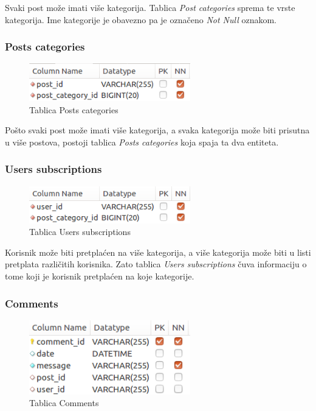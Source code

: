 \documentclass[zavrsni, numeric]{fer}
\begin{document}
Svaki post može imati više kategorija. Tablica \textit{Post categories} sprema te vrste kategorija. Ime kategorije je obavezno pa je označeno \textit{Not Null} oznakom.

\subsubsection{Posts categories}

\begin{figure}[H]
	\centering
	\includegraphics[width=7cm]{slike/t-posts_categories.png}
	\caption{Tablica Posts categories}
	\label{fig:t-posts_categories}
\end{figure}

Pošto svaki post može imati više kategorija, a svaka kategorija može biti prisutna u više postova, postoji tablica \textit{Posts categories} koja spaja ta dva entiteta.

\subsubsection{Users subscriptions}

\begin{figure}[H]
	\centering
	\includegraphics[width=7cm]{slike/t-users_subscriptions.png}
	\caption{Tablica Users subscriptions}
	\label{fig:t-users_subscriptions}
\end{figure}

Korisnik može biti pretplaćen na više kategorija, a više kategorija može biti u listi pretplata različitih korisnika. Zato tablica \textit{Users subscriptions} čuva informaciju o tome koji je korisnik pretplaćen na koje kategorije.

\subsubsection{Comments}

\begin{figure}[H]
	\centering
	\includegraphics[width=7cm]{slike/t-comments.png}
	\caption{Tablica Comments}
	\label{fig:t-comments}
\end{figure}
\end{document}
